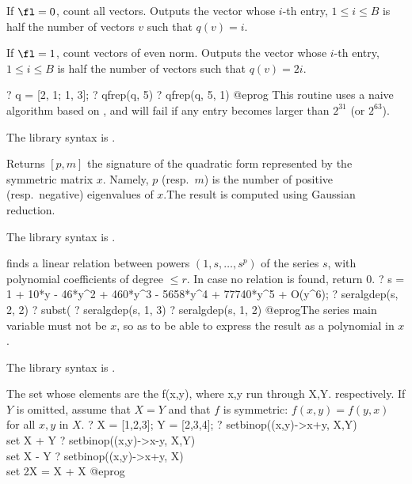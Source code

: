 \item If $\fl = 0$, count all vectors. Outputs the vector whose $i$-th
entry, $1 \leq i \leq B$ is half the number of vectors $v$ such that $q(v)=i$.

\item If $\fl = 1$, count vectors of even norm. Outputs the vector
whose $i$-th entry, $1 \leq i \leq B$ is half the number of vectors such
that $q(v) = 2i$.

\bprog
? q = [2, 1; 1, 3];
? qfrep(q, 5)
? qfrep(q, 5, 1)
@eprog\noindent
This routine uses a naive algorithm based on , and
will fail if any entry becomes larger than $2^{31}$ (or $2^{63}$).

The library syntax is .

\label{se:qfsign}
Returns $[p,m]$ the signature of the quadratic form represented by the
symmetric matrix $x$. Namely, $p$ (resp.~$m$) is the number of positive
(resp.~negative) eigenvalues of $x$.The result is computed using Gaussian
reduction.

The library syntax is .

\label{se:seralgdep}
 finds a linear relation between powers $(1,s,
\dots, s^p)$ of the series $s$, with polynomial coefficients of degree
$\leq r$. In case no relation is found, return $0$.
\bprog
? s = 1 + 10*y - 46*y^2 + 460*y^3 - 5658*y^4 + 77740*y^5 + O(y^6);
? seralgdep(s, 2, 2)
? subst(%
? seralgdep(s, 1, 3)
? seralgdep(s, 1, 2)
@eprog\noindent The series main variable must not be $x$, so as to be able
to express the result as a polynomial in $x$.

The library syntax is .

\label{se:setbinop}
The set whose elements are the f(x,y), where x,y run through X,Y.
respectively. If $Y$ is omitted, assume that $X = Y$ and that $f$ is symmetric:
$f(x,y) = f(y,x)$ for all $x,y$ in $X$.
\bprog
? X = [1,2,3]; Y = [2,3,4];
? setbinop((x,y)->x+y, X,Y) \\ set X + Y
? setbinop((x,y)->x-y, X,Y) \\ set X - Y
? setbinop((x,y)->x+y, X)   \\ set 2X = X + X
@eprog

